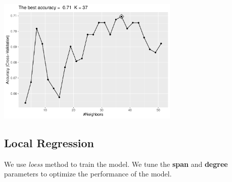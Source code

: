 \documentclass[]{article}
\newenvironment{Shaded}{\begin{snugshade}}{\end{snugshade}}
\newcommand{\CommentTok}[1]{\textcolor[rgb]{0.56,0.35,0.01}{\textit{#1}}}
\newcommand{\DataTypeTok}[1]{\textcolor[rgb]{0.13,0.29,0.53}{#1}}
\newcommand{\KeywordTok}[1]{\textcolor[rgb]{0.13,0.29,0.53}{\textbf{#1}}}
\newcommand{\NormalTok}[1]{#1}
\newcommand{\OperatorTok}[1]{\textcolor[rgb]{0.81,0.36,0.00}{\textbf{#1}}}
\newcommand{\StringTok}[1]{\textcolor[rgb]{0.31,0.60,0.02}{#1}}
\begin{document}
\begin{center}
\includegraphics[width=0.65\textwidth]{LiverDisease_files/figure-latex/unnamed-chunk-26-1.pdf}
\end{center}

\begin{Shaded}
\end{Shaded}

\subsection{Local Regression}

We use \emph{loess} method to train the model. We tune the \textbf{span}
and \textbf{degree} parameters to optimize the performance of the model.
\end{document}

